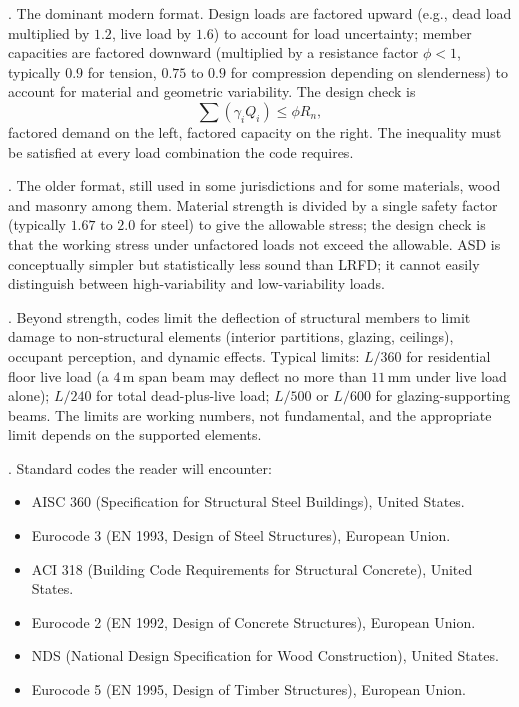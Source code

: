 . The dominant
modern format. Design loads are factored upward (e.g., dead load
multiplied by $1.2$, live load by $1.6$) to account for load
uncertainty; member capacities are factored downward (multiplied by
a resistance factor $\phi < 1$, typically $0.9$ for tension, $0.75$
to $0.9$ for compression depending on slenderness) to account for
material and geometric variability. The design check is
\[
\sum (\gamma_i Q_i) \leq \phi R_n,
\]
factored demand on the left, factored capacity on the right. The
inequality must be satisfied at every load combination the code
requires.

. The older format, still
used in some jurisdictions and for some materials, wood and
masonry among them. Material strength is divided by a single safety factor
(typically $1.67$ to $2.0$ for steel) to give the allowable stress;
the design check is that the working stress under unfactored loads
not exceed the allowable. ASD is conceptually simpler but
statistically less sound than LRFD; it cannot easily distinguish
between high-variability and low-variability loads.

. Beyond strength, codes limit the
deflection of structural members to limit damage to non-structural
elements (interior partitions, glazing, ceilings), occupant
perception, and dynamic effects. Typical limits: $L/360$ for
residential floor live load (a $4\,\si{\meter}$ span beam may
deflect no more than $11\,\si{\milli\meter}$ under live load alone);
$L/240$ for total dead-plus-live load; $L/500$ or $L/600$ for
glazing-supporting beams. The limits are working numbers, not
fundamental, and the appropriate limit depends on the supported
elements.

. Standard codes the reader will encounter:

\begin{itemize}[leftmargin=*]
  \item AISC 360 (Specification for Structural Steel Buildings),
    United States.
  \item Eurocode 3 (EN 1993, Design of Steel Structures), European
    Union.
  \item ACI 318 (Building Code Requirements for Structural Concrete),
    United States.
  \item Eurocode 2 (EN 1992, Design of Concrete Structures),
    European Union.
  \item NDS (National Design Specification for Wood Construction),
    United States.
  \item Eurocode 5 (EN 1995, Design of Timber Structures), European
    Union.
\end{itemize}

